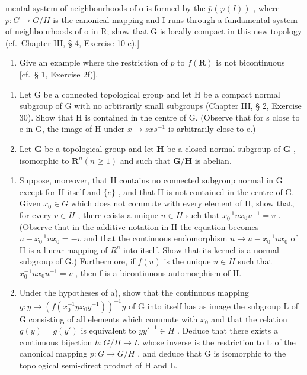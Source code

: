 mental system of neighbourhoods of o is formed by the \(\overline{p}(\varphi(I))\) , where \(p:G\to G/H\) is the canonical mapping and I runs through a fundamental system of neighbourhoods of o in R; show that G is locally compact in this new topology (cf.~Chapter III, § 4, Exercise 10 e).{]}

\begin{enumerate}
\def\labelenumi{\alph{enumi})}
\setcounter{enumi}{2}
\tightlist
\item
  Give an example where the restriction of \(p\) to \(f(\mathbf{R})\) is not bicontinuous {[}cf.~§ 1, Exercise 2f){]}.
\end{enumerate}

\begin{enumerate}
\def\labelenumi{\arabic{enumi})}
\setcounter{enumi}{4}
\item
  Let G be a connected topological group and let H be a compact normal subgroup of G with no arbitrarily small subgroups (Chapter III, § 2, Exercise 30). Show that H is contained in the centre of G. (Observe that for s close to e in G, the image of H under \(x \rightarrow sxs^{-1}\) is arbitrarily close to e.)
\item
  Let \(\mathbf{G}\) be a topological group and let \(\mathbf{H}\) be a closed normal subgroup of \(\mathbf{G}\) , isomorphic to \(\mathbf{R}^n (n\geqslant 1)\) and such that \(\mathbf{G} / \mathbf{H}\) is abelian.
\end{enumerate}

\begin{enumerate}
\def\labelenumi{\alph{enumi})}
\item
  Suppose, moreover, that H contains no connected subgroup normal in G except for H itself and \(\{e\}\) , and that H is not contained in the centre of G. Given \(x_{0} \in G\) which does not commute with every element of H, show that, for every \(v \in H\) , there exists a unique \(u \in H\) such that \(x_{0}^{-1}ux_{0}u^{-1} = v\) . (Observe that in the additive notation in H the equation becomes \(u - x_{0}^{-1}ux_{0} = -v\) and that the continuous endomorphism \(u \to u - x_{0}^{-1}ux_{0}\) of H is a linear mapping of \(R^{n}\) into itself. Show that its kernel is a normal subgroup of G.) Furthermore, if \(f(u)\) is the unique \(u \in H\) such that \(x_{0}^{-1}ux_{0}u^{-1} = v\) , then f is a bicontinuous automorphism of H.
\item
  Under the hypotheses of a), show that the continuous mapping \(g: y \to (f(x_{0}^{-1}yx_{0}y^{-1}))^{-1}y\) of G into itself has as image the subgroup L of G consisting of all elements which commute with \(x_{0}\) and that the relation \(g(y) = g(y')\) is equivalent to \(yy'^{-1} \in H\) . Deduce that there exists a continuous bijection \(h: G/H \to L\) whose inverse is the restriction to L of the canonical mapping \(p: G \to G/H\) , and deduce that G is isomorphic to the topological semi-direct product of H and L.
\end{enumerate}

